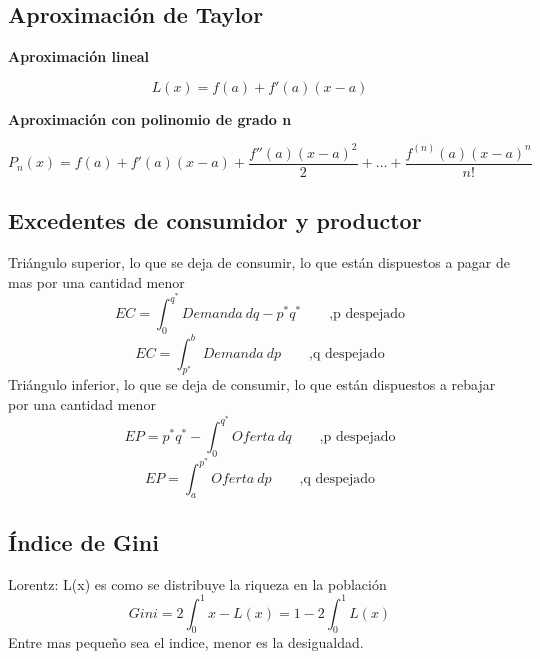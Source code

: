 \subsection{Aproximación de Taylor}
\textbf{Aproximación lineal}

$$L(x)=f(a)+f'(a)(x-a)$$

\textbf{Aproximación con polinomio de grado n}

$$P_n(x)=f(a)+f'(a)(x-a)+\dfrac{f''(a)(x-a)^2}{2}+\dots+\dfrac{f^{(n)}(a)(x-a)^n}{n!}$$


\subsection{Excedentes de consumidor y productor}
Triángulo superior, lo que se deja de consumir, lo que están dispuestos a pagar de mas por una cantidad menor
$$EC=\int_{0}^{q^*}Demanda\ dq-p^*q^*\qquad \text{,p despejado}$$
$$EC=\int_{p^*}^{b}Demanda\ dp \qquad \text{,q despejado}$$
Triángulo inferior, lo que se deja de consumir, lo que están dispuestos a rebajar por una cantidad menor
$$EP=p^*q^*-\int_{0}^{q^*}Oferta\ dq\qquad \text{,p despejado}$$
$$EP=\int_{a}^{p^*}Oferta\ dp\qquad \text{,q despejado}$$

\subsection{Índice de Gini}
Lorentz: L(x) es como se distribuye la riqueza en la población
$$Gini=2\int_{0}^{1}x-L(x)=1-2\int_{0}^{1}L(x)$$
Entre mas pequeño sea el indice, menor es la desigualdad.





\newpage
%
%	
%	

